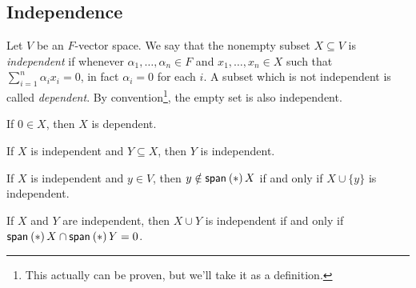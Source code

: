 \documentclass{memoir}
\begin{document}
\subsection*{Independence}
\setcounter{section}{7}
\setcounter{dfn}{0}

\begin{dfn}
Let $V$ be an $F$-vector space. We say that the nonempty subset $X \subseteq V$ is \emph{independent} if whenever $\alpha_1, \ldots, \alpha_n \in F$ and $x_1,\ldots,x_n \in X$ such that $\sum_{i=1}^n \alpha_i x_i = 0$, in fact $\alpha_i = 0$ for each $i$. A subset which is not independent is called \emph{dependent}. By convention\footnote{This actually can be proven, but we'll take it as a definition.}, the empty set is also independent.
\end{dfn}

\begin{prp} \mbox{}
\begin{enumerate*}
\item If $0 \in X$, then $X$ is dependent.
\item If $X$ is independent and $Y \subseteq X$, then $Y$ is independent.
\item If $X$ is independent and $y \in V$, then $y \notin \operatorname{\mathsf{span}}_{}\left(*\right){X}$ if and only if $X \cup \{y\}$ is independent.
\item If $X$ and $Y$ are independent, then $X \cup Y$ is independent if and only if $\operatorname{\mathsf{span}}_{}\left(*\right){X} \cap \operatorname{\mathsf{span}}_{}\left(*\right){Y} = 0$.
\end{enumerate*}
\end{prp}
\end{document}
